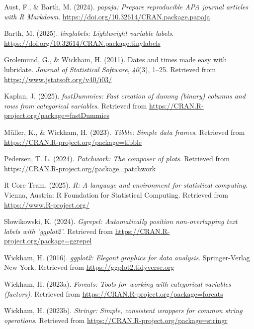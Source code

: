 \documentclass[
  man,floatsintext]{apa6}
\newlength{\cslhangindent}
\newenvironment{CSLReferences}[2] %
 {\begin{list}{}{%
  \setlength{\itemindent}{0pt}
  \setlength{\leftmargin}{0pt}
  \setlength{\parsep}{0pt}
  \ifodd #1
   \setlength{\leftmargin}{\cslhangindent}
   \setlength{\itemindent}{-1\cslhangindent}
  \fi
  \setlength{\itemsep}{#2\baselineskip}}}
 {\end{list}}
\begin{document}
\label{refs}
\begin{CSLReferences}{1}{0}
Aust, F., \& Barth, M. (2024). \emph{{papaja}: {Prepare} reproducible {APA} journal articles with {R Markdown}}. \url{https://doi.org/10.32614/CRAN.package.papaja}

Barth, M. (2025). \emph{{tinylabels}: Lightweight variable labels}. \url{https://doi.org/10.32614/CRAN.package.tinylabels}

Grolemund, G., \& Wickham, H. (2011). Dates and times made easy with {lubridate}. \emph{Journal of Statistical Software}, \emph{40}(3), 1--25. Retrieved from \url{https://www.jstatsoft.org/v40/i03/}

Kaplan, J. (2025). \emph{fastDummies: Fast creation of dummy (binary) columns and rows from categorical variables}. Retrieved from \url{https://CRAN.R-project.org/package=fastDummies}

Müller, K., \& Wickham, H. (2023). \emph{Tibble: Simple data frames}. Retrieved from \url{https://CRAN.R-project.org/package=tibble}

Pedersen, T. L. (2024). \emph{Patchwork: The composer of plots}. Retrieved from \url{https://CRAN.R-project.org/package=patchwork}

R Core Team. (2025). \emph{R: A language and environment for statistical computing}. Vienna, Austria: R Foundation for Statistical Computing. Retrieved from \url{https://www.R-project.org/}

Slowikowski, K. (2024). \emph{Ggrepel: Automatically position non-overlapping text labels with 'ggplot2'}. Retrieved from \url{https://CRAN.R-project.org/package=ggrepel}

Wickham, H. (2016). \emph{ggplot2: Elegant graphics for data analysis}. Springer-Verlag New York. Retrieved from \url{https://ggplot2.tidyverse.org}

Wickham, H. (2023a). \emph{Forcats: Tools for working with categorical variables (factors)}. Retrieved from \url{https://CRAN.R-project.org/package=forcats}

Wickham, H. (2023b). \emph{Stringr: Simple, consistent wrappers for common string operations}. Retrieved from \url{https://CRAN.R-project.org/package=stringr}


\end{CSLReferences}
\end{document}
